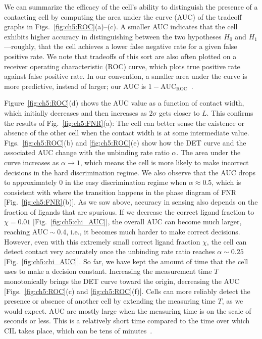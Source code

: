 We can summarize the efficacy of the cell's ability to distinguish the presence of a contacting cell by computing the area under the curve (AUC) of the tradeoff graphs in Figs.~\ref{fig:ch5:ROC}(a)--(c).
A smaller AUC indicates that the cell exhibits higher accuracy in distinguishing between the two hypotheses $H_0$ and $H_1$---roughly, that the cell achieves a lower false negative rate for a given false positive rate.
We note that tradeoffs of this sort are also often plotted on a receiver operating characteristic (ROC) curve, which plots true positive rate against false positive rate.
In our convention, a smaller area under the curve is more predictive, instead of larger; our AUC is $1-\textrm{AUC}_{\textrm{ROC}}$~\cite{navratil2007linear, fawcett2006introduction}.

Figure~\ref{fig:ch5:ROC}(d) shows the AUC value as a function of contact width, which initially decreases and then increases as $2\sigma$ gets closer to $L$.
This confirms the results of Fig.~\ref{fig:ch5:FNR}(a): The cell can better sense the existence or absence of the other cell when the contact width is at some intermediate value.
Figs.~\ref{fig:ch5:ROC}(b) and \ref{fig:ch5:ROC}(e) show how the DET curve and the associated AUC change with the unbinding rate ratio $\alpha$.
The area under the curve increases as $\alpha\to 1$, which means the cell is more likely to make incorrect decisions in the hard discrimination regime.
We also observe that the AUC drops to approximately $0$ in the easy discrimination regime when $\alpha\approx 0.5$, which is consistent with where the transition happens in the phase diagram of FNR [Fig.~\ref{fig:ch5:FNR}(b)].
As we saw above, accuracy in sensing also depends on the fraction of ligands that are spurious.
If we decrease the correct ligand fraction to $\chi=0.01$ [Fig.~\ref{fig:ch5:chi_AUC}], the overall AUC can become much larger, reaching $\textrm{AUC} \sim 0.4$, i.e., it becomes much harder to make correct decisions.
However, even with this extremely small correct ligand fraction $\chi$, the cell can detect contact very accurately once the unbinding rate ratio reaches $\alpha\sim0.25$ [Fig.~\ref{fig:ch5:chi_AUC}].
So far, we have kept the amount of time that the cell uses to make a decision constant.
Increasing the measurement time $T$ monotonically brings the DET curve toward the origin, decreasing the AUC [Figs.~\ref{fig:ch5:ROC}(c) and \ref{fig:ch5:ROC}(f)].
Cells can more reliably detect the presence or absence of another cell by extending the measuring time $T$, as we would expect.
AUC are mostly large when the measuring time is on the scale of seconds or less.
This is a relatively short time compared to the time over which CIL takes place, which can be tens of minutes~\cite{desai2013contact}.


